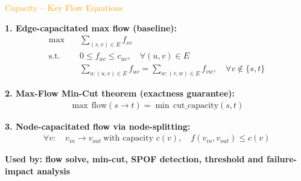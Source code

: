 \documentclass[aspectratio=169]{beamer}
\begin{document}
\begin{frame}{\textcolor{orange}{Capacity – Key Flow Equations}}
\footnotesize

\textbf{1. Edge-capacitated max flow (baseline):}
\begin{align*}
\max \quad & \sum_{(s,v)\in E} f_{sv} \\
\text{s.t.}\quad
& 0 \le f_{uv} \le c_{uv},\quad \forall (u,v)\in E \\
& \sum_{u:(u,v)\in E} f_{uv} = \sum_{w:(v,w)\in E} f_{vw},\quad \forall v\notin\{s,t\}
\end{align*}

\vspace{0.05cm}
\textbf{2. Max-Flow Min-Cut theorem (exactness guarantee):}
\begin{align*}
\max\,\text{flow}(s\to t) = \min\,\text{cut\_capacity}(s,t)
\end{align*}

\vspace{0.05cm}
\textbf{3. Node-capacitated flow via node-splitting:}
\begin{align*}
\forall v:\quad v_{in} \to v_{out}\ \text{with capacity } c(v),\quad
f(v_{in},v_{out}) \le c(v)
\end{align*}

\begin{center}
\textbf{Used by: flow solve, min-cut, SPOF detection, threshold and failure-impact analysis}
\end{center}
\end{frame}
\end{document}
